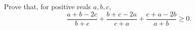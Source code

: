 Prove that, for positive reals $a, b, c$,
\[ \frac{a + b - 2c}{b + c} + \frac{b + c - 2a}{c + a} + \frac{c + a - 2b}{a + b} \geq 0. \]
